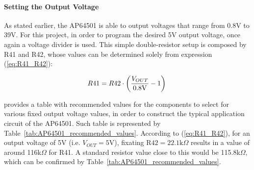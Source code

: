 \paragraph{Setting the Output Voltage}	As stated earlier, the AP64501 is able to output voltages that range from 0.8V to 39V. For this project, in order to program the desired 5V output voltage, once again a voltage divider is used. This simple double-resistor setup is composed by R41 and R42, whose values can be determined solely from expression (\ref{eq:R41_R42}):

\begin{equation}\label{eq:R41_R42}
	R41 = R42 \cdot \left(\frac{V_{OUT}}{0.8 \textrm{V}} - 1\right)\,\medskip
\end{equation}

\cite{AP64501} provides a table with recommended values for the components to select for various fixed output voltage values, in order to construct the typical application circuit of the AP64501. Such table is represented by Table~\ref{tab:AP64501_recommended_values}. According to (\ref{eq:R41_R42}), for an output voltage of 5V (i.e. $V_{OUT} = 5$V), fixating $\textrm{R42} = 22.1 \textrm{k}\Omega$ results in a value of around 116k$\Omega$ for R41. A standard resistor value close to this would be 115.8k$\Omega$, which can be confirmed by Table~\ref{tab:AP64501_recommended_values}.

